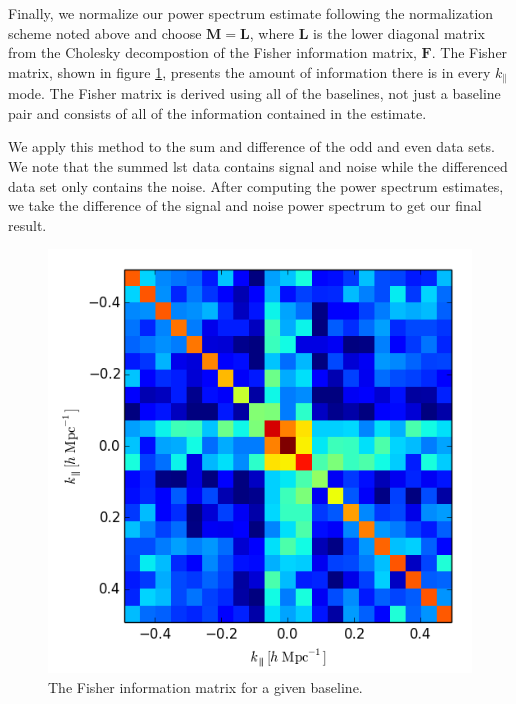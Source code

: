\documentclass[twocolumn,numberedappendix]{emulateapj} \shorttitle{PSA64}
\begin{document}
Finally, we normalize our power spectrum estimate following the normalization
scheme noted above and choose $\mathbf{M} = \mathbf{L}$, where $\mathbf{L}$ is the lower
diagonal matrix from the Cholesky decompostion of the Fisher information matrix,
$\mathbf{F}$. The Fisher matrix, shown in figure \ref{fig:fisher}, presents the amount
of information there is in every $k_{\parallel}$ mode. The Fisher matrix is
derived using all of the baselines, not just a baseline pair and consists of all
of the information contained in the estimate.

We apply this method to the sum and difference of the odd and even data sets. We
note that the summed lst data contains signal and noise while the differenced
data set only contains the noise. After computing the power spectrum estimates,
we take the difference of the signal and noise power spectrum to get our final
result. 

\begin{figure}[h!]\centering
\includegraphics[width=\columnwidth, height=\columnwidth]{plots/fisher.png}
\caption{The Fisher information matrix for a given baseline.}
\label{fig:fisher}
\end{figure}
\end{document}
